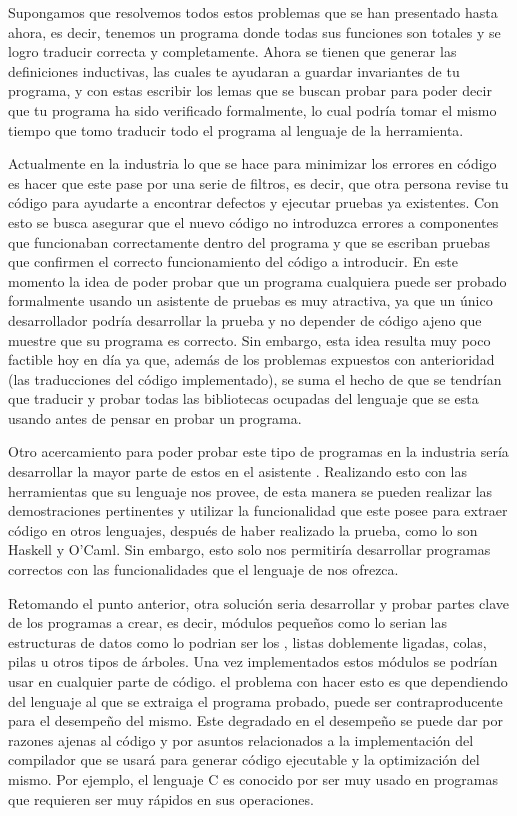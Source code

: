 Supongamos que resolvemos todos estos problemas que se han presentado hasta ahora, es decir,
tenemos un programa donde todas sus funciones son totales y se logro traducir correcta y
completamente. Ahora se tienen que generar las definiciones inductivas, las cuales te ayudaran a
guardar invariantes de tu programa, y con estas escribir los lemas que se buscan probar para poder
decir que tu programa ha sido verificado formalmente, lo cual podría tomar el mismo tiempo que tomo
traducir todo el programa al lenguaje de la herramienta.

Actualmente en la industria lo que se hace para minimizar los errores en c\'odigo es hacer que este
pase por una serie de filtros, es decir, que otra persona revise tu c\'odigo para ayudarte a 
encontrar defectos y ejecutar pruebas ya existentes. Con esto se busca asegurar que el nuevo c\'odigo no
introduzca errores a componentes que funcionaban correctamente dentro del programa y que se escriban 
pruebas que confirmen el correcto funcionamiento del c\'odigo a introducir. En este momento la idea 
de poder probar que un programa cualquiera puede ser probado formalmente usando un asistente de 
pruebas es muy atractiva, ya que un \'unico desarrollador podr\'ia desarrollar la prueba y no 
depender de código ajeno que muestre que su programa es correcto. Sin embargo, esta idea resulta muy 
poco factible hoy en día ya que, además de los problemas expuestos con anterioridad (las 
traducciones del c\'odigo implementado), se suma el hecho de que se tendrían que traducir y probar 
todas las bibliotecas ocupadas del lenguaje que se esta usando antes de pensar en probar un 
programa.

Otro acercamiento para poder probar este tipo de programas en la industria ser\'ia desarrollar la 
mayor parte de estos en el asistente {\coq}. Realizando esto con las herramientas que su lenguaje 
nos provee, de esta manera se pueden realizar las demostraciones pertinentes y utilizar la 
funcionalidad que este posee para extraer c\'odigo en otros lenguajes, después de haber realizado la 
prueba, como lo son Haskell y O'Caml. Sin embargo, esto solo nos permitiría desarrollar programas 
correctos con las funcionalidades que el lenguaje de {\coq} nos ofrezca.

Retomando el punto anterior, otra soluci\'on seria desarrollar y probar partes clave de los 
programas a crear, es decir, m\'odulos pequeños como lo serian las estructuras de datos como 
lo podrian ser los {\arns}, listas doblemente ligadas, colas, pilas u otros tipos de \'arboles. Una 
vez implementados estos m\'odulos se podrían usar en cualquier parte de c\'odigo. el problema con 
hacer esto es que dependiendo del lenguaje al que se extraiga el programa probado, puede ser 
contraproducente para el desempeño del mismo. Este degradado en el desempeño se puede dar por 
razones ajenas al c\'odigo y por asuntos relacionados a la implementaci\'on del compilador que 
se usar\'a para generar c\'odigo ejecutable y la optimizaci\'on del mismo. Por ejemplo, el 
lenguaje C es conocido por ser muy usado en programas que requieren ser muy rápidos en sus 
operaciones.

